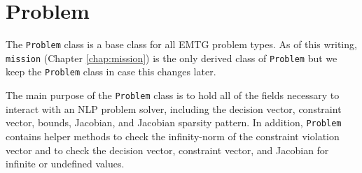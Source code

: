 \section{Problem}
\label{sec:problem}

The \texttt{Problem} class is a base class for all EMTG problem types. As of this writing, \texttt{mission} (Chapter \ref{chap:mission}) is the only derived class of \texttt{Problem} but we keep the \texttt{Problem} class in case this changes later.

The main purpose of the \texttt{Problem} class is to hold all of the fields necessary to interact with an \ac{NLP} problem solver, including the decision vector, constraint vector, bounds, Jacobian, and Jacobian sparsity pattern. In addition, \texttt{Problem} contains helper methods to check the infinity-norm of the constraint violation vector and to check the decision vector, constraint vector, and Jacobian for infinite or undefined values.